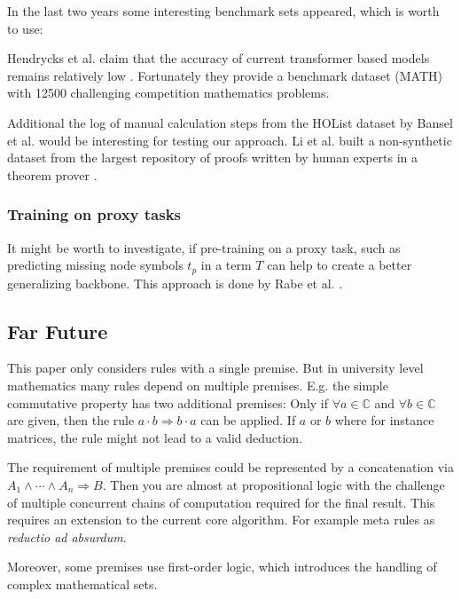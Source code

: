 \documentclass{scrartcl}
\theoremstyle{definition}
\begin{document}
In the last two years some interesting benchmark sets appeared, which is worth to use:

Hendrycks et al. claim that the accuracy of current transformer based models remains relatively low \cite{hendrycks2021measuring}.
Fortunately they provide a benchmark dataset (MATH) with 12500 challenging competition mathematics problems.

Additional the log of manual calculation steps from the HOList dataset by Bansel et al. \cite{kaliszyk2017holstep} would be interesting for testing our approach.
Li et al. built a non-synthetic dataset from the largest repository of proofs written by human experts in a theorem prover \cite{li2021isarstep}.

\subsubsection{Training on proxy tasks}

It might be worth to investigate, if pre-training on a proxy task, such as predicting missing node symbols $t_p$ in a term $T$ can help to create a better generalizing backbone.
This approach is done by Rabe et al. \cite{rabe2020mathematical}.

\subsection{Far Future}

This paper only considers rules with a single premise.
But in university level mathematics many rules depend on multiple premises.
E.g. the simple commutative property has two additional premises: Only if $\forall a \in \mathbb{C}$ and $\forall b \in \mathbb{C}$ are given,
then the rule $a\cdot b \Longrightarrow b\cdot a$ can be applied. If $a$ or $b$ where for instance matrices, the rule might not lead to a valid deduction.

The requirement of multiple premises could be represented by a concatenation via $A_1 \wedge \cdots \wedge A_n \Longrightarrow B$.
Then you are almost at propositional logic with the challenge of multiple concurrent chains of computation required for the final result.
This requires an extension to the current core algorithm. For example meta rules as \textit{reductio ad absurdum}.

Moreover, some premises use first-order logic, which introduces the handling of complex mathematical sets.


\printbibliography
\end{document}
